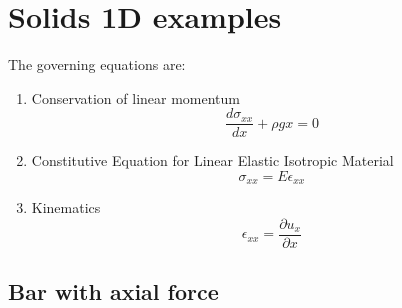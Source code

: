 \documentclass[letterpaper,11pt]{article}
\begin{document}
\section{Solids 1D examples}

The governing equations are:

\begin{enumerate}
\item Conservation of linear momentum
\begin{equation}
\frac{d \sigma_{xx}}{dx} + \rho g x = 0
\end{equation}
\item Constitutive Equation for Linear Elastic Isotropic Material
\begin{equation}
\sigma_{xx} = E \epsilon_{xx}
\end{equation}
\item Kinematics
\begin{equation}
\epsilon_{xx} = \frac{\partial u_x}{\partial x}
\end{equation}
\end{enumerate}

\subsection{Bar with axial force}
\end{document}
